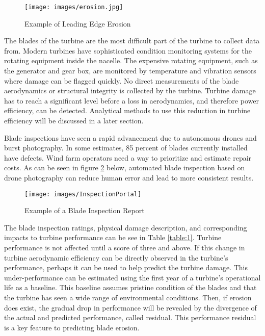 \documentclass[runningheads]{llncs}
\begin{document}
\begin{figure}[H]
    \centering
    \texttt{[image: images/erosion.jpg]}
    \caption{Example of Leading Edge Erosion}
    \label{fig:Erosion}
\end{figure}

The blades of the turbine are the most difficult part of the turbine to collect data from. Modern turbines have sophisticated condition monitoring systems for the rotating equipment inside the nacelle.  The expensive rotating equipment, such as the generator and gear box, are monitored by temperature and vibration sensors where damage can be flagged quickly. No direct measurements of the blade aerodynamics or structural integrity is collected by the turbine. Turbine damage has to reach a significant level before a loss in aerodynamics, and therefore power efficiency, can be detected. Analytical methods to use this reduction in turbine efficiency will be discussed in a later section. 

Blade inspections have seen a rapid advancement due to autonomous drones and burst photography. In some estimates, 85 percent of blades currently installed have defects\cite{Jeffrey}. Wind farm operators need a way to prioritize and estimate repair costs. As can be seen in figure \ref{fig:InspectionPortal} below, automated blade inspection based on drone photography can reduce human error and lead to more consistent results. 
 
\begin{figure}[H]
    \centering
    \texttt{[image: images/InspectionPortal]}
    \caption{Example of a Blade Inspection Report}
    \label{fig:InspectionPortal}
\end{figure}

The blade inspection ratings, physical damage description, and corresponding impacts to turbine performance can be see in Table \ref{table:1}. Turbine performance is not affected until a score of three and above. If this change in turbine aerodynamic efficiency can be directly observed in the turbine's performance, perhaps it can be used to help predict the turbine damage. This under-performance can be estimated using the first year of a turbine's operational life as a baseline. This baseline assumes pristine condition of the blades and that the turbine has seen a wide range of environmental conditions. Then, if erosion does exist, the gradual drop in performance will be revealed by the divergence of the actual and predicted performance, called residual. This performance residual is a key feature to predicting blade erosion. 
\end{document}
